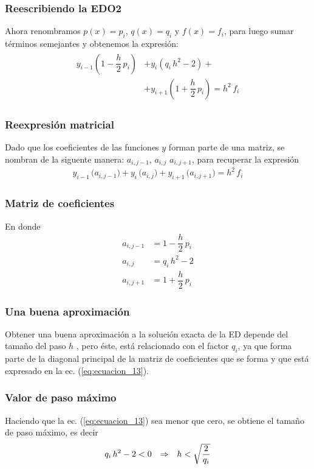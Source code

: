 \begin{frame}
\frametitle{Reescribiendo la EDO2}
Ahora renombramos $p(x) = p_{i}$, $q(x) = q_{i}$ y $f(x) = f_{i}$, para luego sumar términos semejantes y obtenemos la expresión:
\begin{align}
\begin{aligned}
y_{i-1} \left( 1- \dfrac{h}{2} \, p_{i} \right) &+ y_{i} \left( q_{i} \, h^{2} -2 \right) + \\[0.5em]
&+ y_{i+1} \left( 1 + \dfrac{h}{2} \, p_{i} \right) = h^{2} \, f_{i}
\end{aligned}
\label{eq:ecuacion_10}
\end{align}
\end{frame}
\begin{frame}
\frametitle{Reexpresión matricial}
Dado que los coeficientes de las funciones $y$ forman parte de una matriz, se nombran de la siguente manera: $a_{i, j-1}$, $a_{i,j}$ $a_{i, j+1}$, para recuperar la expresión
\begin{align}
y_{i-1} \, \big( a_{i, j-1} \big) + y_{i} \, \big( a_{i, j} \big) + y_{i+1} \, \big( a_{i, j+1} \big) = h^{2} \, f_{i}
\label{eq:ecuacion_11}
\end{align}
\end{frame}
\begin{frame}
\frametitle{Matriz de coeficientes}
En donde
\begin{align}
a_{i, j-1} &= 1 -\dfrac{h}{2} \, p_{i} \label{eq:ecuacion_12} \\[0.5em]
a_{i, j} &= q_{i} \, h^{2} - 2 \label{eq:ecuacion_13} \\[0.5em]
a_{i, j+1} &= 1 +\dfrac{h}{2} \, p_{i} \label{eq:ecuacion_14}
\end{align}
\end{frame}
\begin{frame}
\frametitle{Una buena aproximación}
Obtener una buena aproximación a la solución exacta de la ED depende del tamaño del paso $h$ , pero éste, está relacionado con el factor  $q_{i}$, ya que forma parte de la diagonal principal de la matriz de coeficientes que se forma y que está expresado en la ec. (\ref{eq:ecuacion_13}).
\end{frame}
\begin{frame}
\frametitle{Valor de paso máximo}
Haciendo que la ec. (\ref{eq:ecuacion_13}) sea menor que cero, se obtiene el tamaño de paso máximo, es decir
\begin{align}
q_{i} \, h^{2} - 2 < 0 \hspace{0.25cm} \Rightarrow \hspace{0.25cm} h < \sqrt{\dfrac{2}{q_{i}}}
\label{eq:ecuacion_15}
\end{align}
\end{frame}
